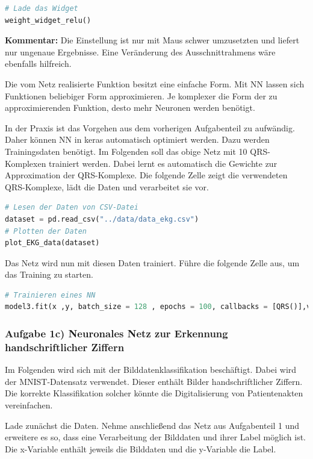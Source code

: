 \documentclass[a4paper,10pt,titlepage]{scrartcl}
\begin{document}
\begin{lstlisting}[language=python]
# Lade das Widget
weight_widget_relu()
\end{lstlisting}
\textbf{Kommentar:} Die Einstellung ist nur mit Maus schwer umzusetzten und liefert nur ungenaue Ergebnisse. Eine Veränderung des Ausschnittrahmens wäre ebenfalls hilfreich.

Die vom Netz realisierte Funktion besitzt eine einfache Form. Mit NN lassen sich Funktionen beliebiger Form approximieren. Je komplexer die Form der zu approximierenden Funktion, desto mehr Neuronen werden benötigt.

In der Praxis ist das Vorgehen aus dem vorherigen Aufgabenteil zu aufwändig. Daher können NN in keras automatisch optimiert werden.
Dazu werden Trainingsdaten benötigt. Im Folgenden soll das obige Netz mit 10 QRS-Komplexen trainiert werden. Dabei lernt es automatisch die Gewichte zur Approximation der QRS-Komplexe. Die folgende Zelle zeigt die verwendeten QRS-Komplexe, lädt die Daten und verarbeitet sie vor.

\begin{lstlisting}[language=python]
# Lesen der Daten von CSV-Datei
dataset = pd.read_csv("../data/data_ekg.csv")  
# Plotten der Daten
plot_EKG_data(dataset)
\end{lstlisting}

Das Netz wird nun mit diesen Daten trainiert. Führe die folgende Zelle aus, um das Training zu starten.

\begin{lstlisting}[language=python]
# Trainieren eines NN 
model3.fit(x ,y, batch_size = 128 , epochs = 100, callbacks = [QRS()],verbose=0)
\end{lstlisting}

\subsubsection{Aufgabe 1c) Neuronales Netz zur Erkennung handschriftlicher Ziffern}
Im Folgenden wird sich mit der Bilddatenklassifikation beschäftigt. Dabei wird der MNIST-Datensatz verwendet. Dieser enthält Bilder handschriftlicher Ziffern. Die korrekte Klassifikation solcher könnte die Digitalisierung von Patientenakten vereinfachen.

Lade zunächst die Daten. Nehme anschließend das Netz aus Aufgabenteil 1 und erweitere es so, dass eine Verarbeitung der Bilddaten und ihrer Label möglich ist. Die x-Variable enthält jeweils die Bilddaten und die y-Variable die Label.
\end{document}

